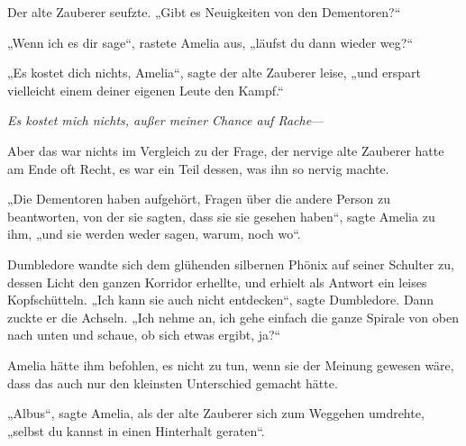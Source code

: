 Der alte Zauberer seufzte. „Gibt es Neuigkeiten von den Dementoren?“

„Wenn ich es dir sage“, rastete Amelia aus, „läufst du dann wieder weg?“

„Es kostet dich nichts, Amelia“, sagte der alte Zauberer leise, „und erspart vielleicht einem deiner eigenen Leute den Kampf.“

\emph{Es kostet mich nichts, außer meiner Chance auf Rache}—

Aber das war nichts im Vergleich zu der Frage, der nervige alte Zauberer hatte am Ende oft Recht, es war ein Teil dessen, was ihn so nervig machte.

„Die Dementoren haben aufgehört, Fragen über die andere Person zu beantworten, von der sie sagten, dass sie sie gesehen haben“, sagte Amelia zu ihm, „und sie werden weder sagen, warum, noch wo“.

Dumbledore wandte sich dem glühenden silbernen Phönix auf seiner Schulter zu, dessen Licht den ganzen Korridor erhellte, und erhielt als Antwort ein leises Kopfschütteln. „Ich kann sie auch nicht entdecken“, sagte Dumbledore. Dann zuckte er die Achseln. „Ich nehme an, ich gehe einfach die ganze Spirale von oben nach unten und schaue, ob sich etwas ergibt, ja?“

Amelia hätte ihm befohlen, es nicht zu tun, wenn sie der Meinung gewesen wäre, dass das auch nur den kleinsten Unterschied gemacht hätte.

„Albus“, sagte Amelia, als der alte Zauberer sich zum Weggehen umdrehte, „selbst du kannst in einen Hinterhalt geraten“.

